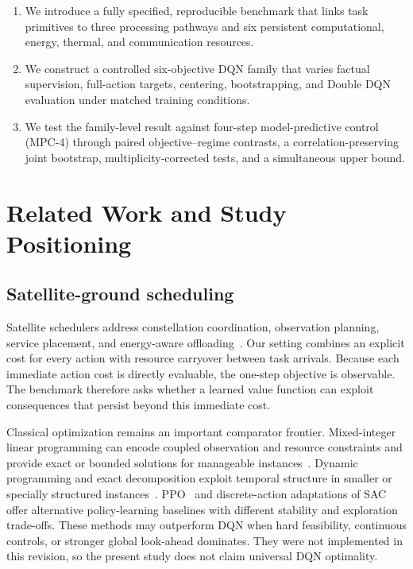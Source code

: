 \documentclass[remotesensing,article,submit,moreauthors]{Definitions/mdpi}
\newenvironment{revisedblock}{\color{red}}{}
\newenvironment{revisedblock}{}{}
\begin{document}
\begin{enumerate}[leftmargin=1.6em]
    \item We introduce a fully specified, reproducible benchmark that links task primitives to three processing pathways and six persistent computational, energy, thermal, and communication resources.
    \item We construct a controlled six-objective DQN family that varies factual supervision, full-action targets, centering, bootstrapping, and Double DQN evaluation under matched training conditions.
    \item We test the family-level result against four-step model-predictive control (MPC-4) through \DQNvsMPCContrastCount{} paired objective--regime contrasts, a correlation-preserving joint bootstrap, multiplicity-corrected tests, and a simultaneous upper bound.
\end{enumerate}

\section{Related Work and Study Positioning}

\subsection{Satellite-ground scheduling}

Satellite schedulers address constellation coordination, observation planning, service placement, and energy-aware offloading~\cite{RN8,RN10,RN20,RN22,RN23,RN27,RN28}. Our setting combines an explicit cost for every action with resource carryover between task arrivals. Because each immediate action cost is directly evaluable, the one-step objective is observable. The benchmark therefore asks whether a learned value function can exploit consequences that persist beyond this immediate cost.

\begin{revisedblock}
Classical optimization remains an important comparator frontier. Mixed-integer linear programming can encode coupled observation and resource constraints and provide exact or bounded solutions for manageable instances~\cite{chen2019milp}. Dynamic programming and exact decomposition exploit temporal structure in smaller or specially structured instances~\cite{peng2020exact}. PPO~\cite{schulman2017ppo} and discrete-action adaptations of SAC~\cite{haarnoja2018sac} offer alternative policy-learning baselines with different stability and exploration trade-offs. These methods may outperform DQN when hard feasibility, continuous controls, or stronger global look-ahead dominates. They were not implemented in this revision, so the present study does not claim universal DQN optimality.
\end{revisedblock}
\end{document}
